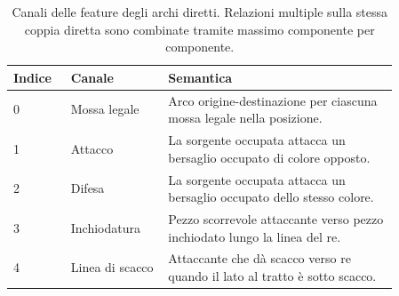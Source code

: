 \begin{table}[H]
\centering
\small
\caption{Canali delle feature degli archi diretti.  Relazioni multiple sulla stessa coppia diretta sono combinate tramite massimo componente per componente.}
\label{tab:edge-features}
\begin{tabular}{p{0.12\linewidth}p{0.22\linewidth}p{0.52\linewidth}}
\toprule
Indice & Canale & Semantica \\
\midrule
0 & Mossa legale & Arco origine-destinazione per ciascuna mossa legale nella posizione. \\
1 & Attacco & La sorgente occupata attacca un bersaglio occupato di colore opposto. \\
2 & Difesa & La sorgente occupata attacca un bersaglio occupato dello stesso colore. \\
3 & Inchiodatura & Pezzo scorrevole attaccante verso pezzo inchiodato lungo la linea del re. \\
4 & Linea di scacco & Attaccante che dà scacco verso re quando il lato al tratto è sotto scacco. \\
\bottomrule
\end{tabular}
\end{table}
